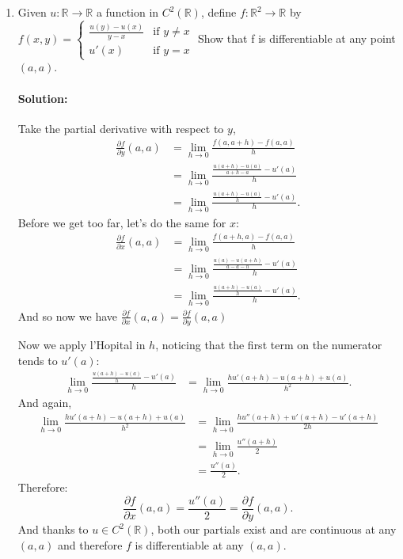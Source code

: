 \documentclass{article}
\begin{document}
\begin{enumerate}
\newpage

\item Given $u : \mathbb{R} \to \mathbb{R}$ a function in $C^2(\mathbb{R})$, define $f : \mathbb{R}^2 \to \mathbb{R}$ by  $f(x,y) = \begin{cases} \frac{u(y) - u(x)}{y-x} & \text{if } y \neq x \\ u'(x) & \text{if } y = x \end{cases}$  Show that f is differentiable at any point $(a,a)$.  
    \paragraph{Solution: }Take the partial derivative with respect to $y$,
    \begin{align*}
        \frac{\partial f}{\partial y}(a,a) &= \lim_{h \to 0} \frac{f(a,a+h)-f(a,a)  }{h} \\
        &= \lim_{h \to 0} \frac{ \frac{u(a+h)-u(a)}{a+h-a}-u'(a)}{h} \\
        &= \lim_{h \to 0} \frac{ \frac{u(a+h)-u(a)}{h}-u'(a)}{h}
    .\end{align*}
    Before we get too far, let's do the same for $x$:
    \begin{align*}
        \frac{\partial f}{\partial x}(a,a) &= \lim_{h \to 0} \frac{f(a+h,a)-f(a,a)  }{h} \\
        &= \lim_{h \to 0} \frac{ \frac{u(a)-u(a+h)}{a-a-h}-u'(a)}{h} \\
        &= \lim_{h \to 0} \frac{ \frac{u(a+h)-u(a)}{h}-u'(a)}{h}
    .\end{align*}
    And so now we have $\frac{\partial f}{\partial x} (a,a)=\frac{\partial f}{\partial y} (a,a) $

    Now we apply l'Hopital in $h$, noticing that the first term on the numerator tends to $u'(a)$:
    \begin{align*}
        \lim_{h \to 0} \frac{ \frac{u(a+h)-u(a)}{h}-u'(a)}{h}
        &=\lim_{h \to 0} \frac{hu'(a+h)-u(a+h)+u(a)}{h^2}
    .\end{align*}
    And again,
    \begin{align*}
        \lim_{h \to 0} \frac{hu'(a+h)-u(a+h)+u(a)}{h^2}&=\lim_{h \to 0} \frac{hu''(a+h)+u'(a+h)-u'(a+h)}{2h}\\
        &= \lim_{h \to 0}  \frac{u''(a+h)}{2} \\
        &= \frac{u''(a)}{2}
    .\end{align*}
    Therefore:
    \[
        \frac{\partial f}{\partial x}(a,a) = \frac{u''(a)}{2}= \frac{\partial f}{\partial y}(a,a) 
    .\] 
    And thanks to $u\in C^2(\mathbb{R})$, both our partials exist and are continuous at any $(a,a)$ and therefore $f$ is differentiable at any $(a,a)$.


\end{enumerate}
\end{document}
